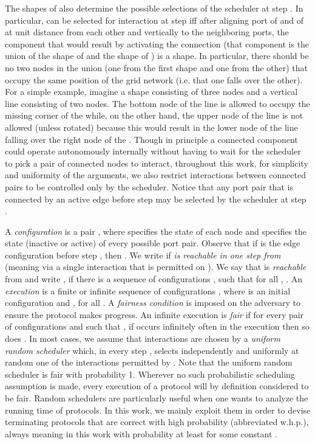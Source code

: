 \documentclass[oribibl, 11pt]{llncs}
\begin{document}
The shapes of  also determine the possible selections of the scheduler at step . In particular,  can be selected for interaction at step  iff after aligning port  of  and  of  at unit distance from each other and vertically to the neighboring ports, the component that would result by activating the connection (that component is the union of the shape of  and the shape of ) is a shape. In particular, there should be no two nodes in the union (one from the first shape and one from the other) that occupy the same position of the grid network (i.e. that one falls over the other). For a simple example, imagine a \huge  \normalsize shape consisting of three nodes and a vertical line  consisting of two nodes. The bottom node of the line is allowed to occupy the missing corner of the \huge  \normalsize while, on the other hand, the upper node of the line is not allowed (unless rotated) because this would result in the lower node of the line falling over the right node of the \huge \normalsize . Though in principle a connected component could operate autonomously internally without having to wait for the scheduler to pick a pair of connected nodes to interact, throughout this work, for simplicity and uniformity of the arguments, we also restrict interactions between connected pairs to be controlled only by the scheduler. Notice that any port pair that is connected by an active edge before step  may be selected by the scheduler at step . 

A \emph{configuration}  is a pair , where  specifies the state of each node and  specifies the state (inactive or active) of every possible port pair. Observe that if  is the edge configuration before step , then . We write  if \emph{ is reachable in one step from } (meaning via a single interaction that is permitted on ). We say that  is \emph{reachable} from  and write , if there is a sequence of configurations , such that  for all , . An \emph{execution} is a finite or infinite sequence of configurations  , where  is an initial configuration and , for all . A \emph{fairness condition} is imposed on the adversary to ensure the protocol makes progress. An infinite execution is \emph{fair} if for every pair of configurations  and  such that , if  occurs infinitely often in the execution then so does . In most cases, we assume that interactions are chosen by a \emph{uniform random scheduler} which, in every step , selects independently and uniformly at random one of the interactions permitted by . Note that the uniform random scheduler is fair with probability 1. Wherever no such probabilistic scheduling assumption is made, every execution of a protocol will by definition considered to be fair. Random schedulers are particularly useful when one wants to analyze the running time of protocols. In this work, we mainly exploit them in order to devise terminating protocols that are correct with high probability (abbreviated w.h.p.), always meaning in this work with probability at least  for some constant .
\end{document}
